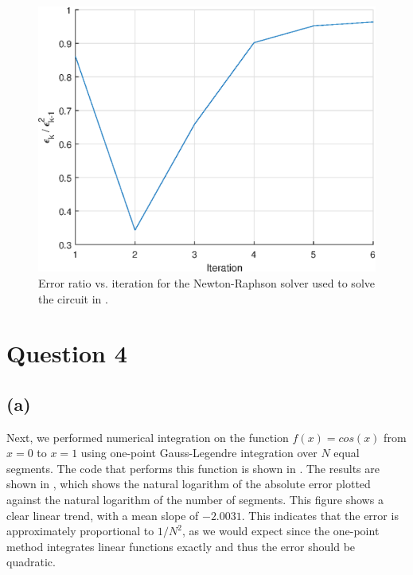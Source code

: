 \documentclass[journal,hidelinks]{IEEEtran}
\begin{document}
\begin{figure}[!htb]
  \centering
  \includegraphics[width=\columnwidth]{question-3/error_ratio.eps}
  \caption{Error ratio vs. iteration for the Newton-Raphson solver used to solve the circuit in .}
  \label{fig:q3-error-ratio}
\end{figure}

\section*{Question 4}
\subsection*{(a)}

Next, we performed numerical integration on the function $f(x) = cos(x)$ from $x = 0$ to $x = 1$ using one-point Gauss-Legendre integration over $N$ equal segments. The code that performs this function is shown in . The results are shown in , which shows the natural logarithm of the absolute error plotted against the natural logarithm of the number of segments. This figure shows a clear linear trend, with a mean slope of $-2.0031$. This indicates that the error is approximately proportional to $1/N^2$, as we would expect since the one-point method integrates linear functions exactly and thus the error should be quadratic.
\end{document}
